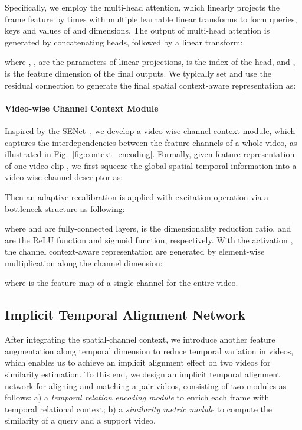 \documentclass{article}
\begin{document}
Specifically, we employ the multi-head attention, which linearly projects the frame feature  by  times with multiple learnable linear transforms to form queries, keys and values of  and  dimensions. The output of multi-head attention is generated by concatenating  heads, followed by a linear transform:

where , ,  are the parameters of linear projections,  is the index of the head,
and ,  is the feature dimension of the final outputs. 
We typically set  and use the residual connection to generate the final spatial context-aware representation as:



\paragraph{Video-wise Channel Context Module}
Inspired by the SENet~\cite{hu2018squeeze}, we develop a video-wise channel context module, which captures the interdependencies between the feature channels of a whole video, as illustrated in Fig.~\ref{fig:context_encoding}.
Formally, given feature representation of one video clip , we first squeeze the global spatial-temporal information into a video-wise channel descriptor as:

Then an adaptive recalibration is applied with excitation operation via a bottleneck structure as following:

where  and  are fully-connected layers,  is the dimensionality reduction ratio.  and  are the ReLU function and sigmoid function, respectively.
With the activation , the channel context-aware representation are generated by element-wise multiplication along the channel dimension:

where  is the feature map of a single channel for the entire video.


\subsection{Implicit Temporal Alignment Network}\label{sec:alignment}
After integrating the spatial-channel context, we introduce another feature augmentation along temporal dimension to reduce temporal variation in videos, which enables us to achieve an implicit alignment effect on two videos for similarity estimation. To this end, we design an implicit temporal alignment network for aligning and matching a pair videos, consisting of two modules as follows: a) a \textit{temporal relation encoding module} to enrich each frame with temporal relational context; b) a \textit{similarity metric module} to compute the similarity of a query and a support video.
\end{document}
